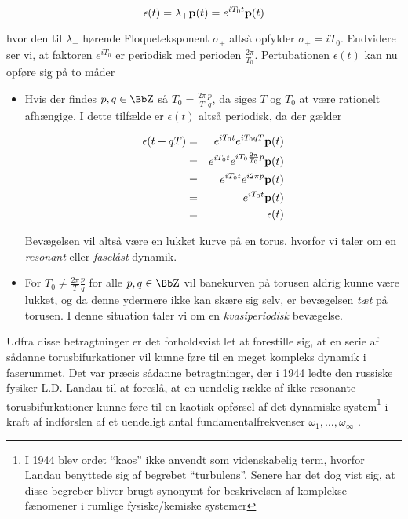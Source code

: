 \begin{equation}
 \epsilon(t) = \lambda_+ {\bf p}(t) = e^{i T_0t} {\bf p}(t)
 \label{eq:TorusPert}
\end{equation}

hvor den til $\lambda_+$ h{\o}rende Floqueteksponent
$\sigma_+$ alts{\aa} opfylder $\sigma_+ = i T_0$. Endvidere
ser vi, at faktoren $e^{i T_0}$ er periodisk med perioden
$\frac{2\pi}{T_0}$. Pertubationen $\epsilon(t)$ kan nu
opf{\o}re sig p{\aa} to m{\aa}der

\begin{itemize}
  \item Hvis der findes $p,q \in \Z$ s{\aa}
  $T_0 = \frac{2\pi}{T}\frac{p}{q}$, da siges $T$ og $T_0$
  at v{\ae}re rationelt afh{\ae}ngige. I dette tilf{\ae}lde
  er $\epsilon(t)$ alts{\aa} periodisk, da der g{\ae}lder

  \begin{eqnarray}
    \epsilon(t+qT) & = & e^{i T_0t}e^{i T_0qT} {\bf
    p}(t)\nonumber\\ & = & e^{i T_0t}e^{i
    T_0\frac{2\pi}{T_0}p} {\bf p}(t)\nonumber\\ & = & e^{i
    T_0t}e^{i 2\pi p} {\bf p}(t)\nonumber\\ & = & e^{i
    T_0t}{\bf p}(t)\nonumber\\ & = & \epsilon(t)
  \end{eqnarray}

  Bev{\ae}gelsen vil alts{\aa} v{\ae}re en lukket kurve
  p{\aa} en torus, hvorfor vi taler om en {\em resonant}
  eller {\em fasel{\aa}st\/} dynamik.
  \item For $T_0 \neq \frac{2\pi}{T}\frac{p}{q}$ for alle
  $p,q \in \Z$ vil banekurven p{\aa} torusen aldrig kunne
  v{\ae}re lukket, og da denne ydermere ikke kan sk{\ae}re
  sig selv, er bev{\ae}gelsen {\em t{\ae}t} p{\aa} torusen.
  I denne situation taler vi om en {\em kvasiperiodisk}
  bev{\ae}gelse.
\end{itemize}

Udfra disse betragtninger er det forholdsvist let at
forestille sig, at en serie af s{\aa}danne
torusbifurkationer vil kunne f{\o}re til en meget kompleks
dynamik i faserummet. Det var pr{\ae}cis s{\aa}danne
betragtninger, der i 1944 ledte den russiske fysiker L.D.
Landau til at foresl{\aa}, at en uendelig r{\ae}kke af
ikke-resonante torusbifurkationer kunne f{\o}re til en
kaotisk opf{\o}rsel af det dynamiske sy\-stem\footnote{I 1944
blev ordet ``kaos'' ikke anvendt som videnskabelig term,
hvorfor Landau benyttede sig af begrebet ``turbulens''.
Senere har det dog vist sig, at disse begreber bliver brugt
synonymt for beskrivelsen af komplekse f{\ae}nomener i
rumlige fysiske/kemiske sy\-stemer} i kraft af indf{\o}rslen
af et uendeligt antal fundamentalfrekvenser
$\omega_1,\ldots,\omega_\infty$ \cite{Landau}.

